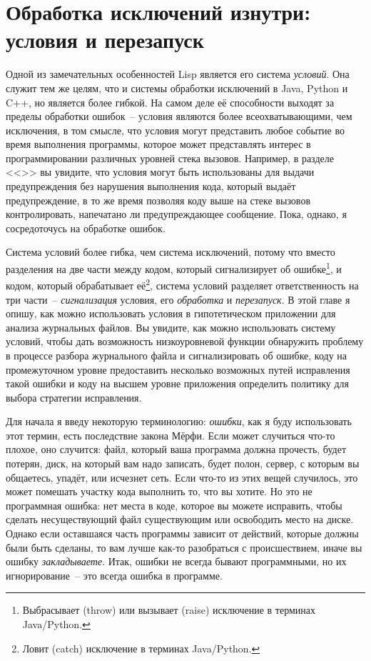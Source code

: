 \chapter{Обработка исключений изнутри: условия и перезапуск}
\label{ch:19}

\thispagestyle{empty}

Одной из замечательных особенностей Lisp является его система \textit{условий}. Она служит
тем же целям, что и системы обработки исключений в Java, Python и C++, но является более
гибкой. На самом деле её способности выходят за пределы обработки ошибок~-- условия
являются более всеохватывающими, чем исключения, в том смысле, что условия могут
представить любое событие во время выполнения программы, которое может представлять
интерес в программировании различных уровней стека вызовов. Например, в разделе
<<>> вы увидите, что условия могут быть использованы для выдачи
предупреждения без нарушения выполнения кода, который выдаёт предупреждение, в то же время
позволяя коду выше на стеке вызовов контролировать, напечатано ли предупреждающее
сообщение. Пока, однако, я сосредоточусь на обработке ошибок.

Система условий более гибка, чем система исключений, потому что вместо разделения на две
части между кодом, который сигнализирует об ошибке\footnote{Выбрасывает (throw) или
  вызывает (raise) исключение в терминах Java/Python.}, и кодом, который обрабатывает
её\footnote{Ловит (catch) исключение в терминах Java/Python.}, система условий разделяет
ответственность на три части~-- \textit{сигнализация} условия, его \textit{обработка} и
\textit{перезапуск}. В этой главе я опишу, как можно использовать условия в гипотетическом
приложении для анализа журнальных файлов. Вы увидите, как можно использовать систему
условий, чтобы дать возможность низкоуровневой функции обнаружить проблему в процессе
разбора журнального файла и сигнализировать об ошибке, коду на промежуточном уровне
предоставить несколько возможных путей исправления такой ошибки и коду на высшем уровне
приложения определить политику для выбора стратегии исправления.

Для начала я введу некоторую терминологию: \textit{ошибки}, как я буду использовать этот
термин, есть последствие закона Мёрфи. Если может случиться что-то плохое, оно случится:
файл, который ваша программа должна прочесть, будет потерян, диск, на который вам надо
записать, будет полон, сервер, с которым вы общаетесь, упадёт, или исчезнет сеть. Если
что-то из этих вещей случилось, это может помешать участку кода выполнить то, что вы
хотите. Но это не программная ошибка: нет места в коде, которое вы можете исправить, чтобы
сделать несуществующий файл существующим или освободить место на диске. Однако если
оставшаяся часть программы зависит от действий, которые должны были быть сделаны, то вам
лучше как-то разобраться с происшествием, иначе вы ошибку \textit{закладываете}. Итак,
ошибки не всегда бывают программными, но их игнорирование~-- это всегда ошибка в
программе.

